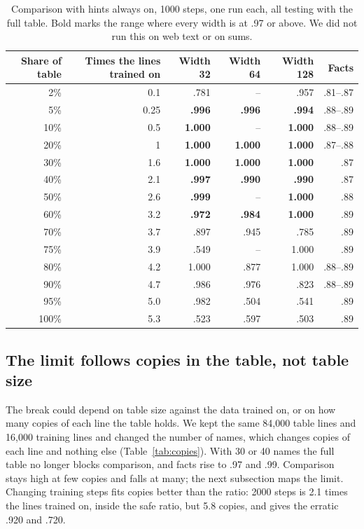 \documentclass[11pt]{article}
\begin{document}
\begin{table}[h]\centering\small
\begin{tabular}{rrrrrr}\toprule
Share of table & Times the lines trained on & Width 32 & Width 64 & Width 128 & Facts\\\midrule
2\% & 0.1 & .781 & -- & .957 & .81--.87\\
5\% & 0.25 & \textbf{.996} & \textbf{.996} & \textbf{.994} & .88--.89\\
10\% & 0.5 & \textbf{1.000} & -- & \textbf{1.000} & .88--.89\\
20\% & 1 & \textbf{1.000} & \textbf{1.000} & \textbf{1.000} & .87--.88\\
30\% & 1.6 & \textbf{1.000} & \textbf{1.000} & \textbf{1.000} & .87\\
40\% & 2.1 & \textbf{.997} & \textbf{.990} & \textbf{.990} & .87\\
50\% & 2.6 & \textbf{.999} & -- & \textbf{1.000} & .88\\
60\% & 3.2 & \textbf{.972} & \textbf{.984} & \textbf{1.000} & .89\\
70\% & 3.7 & .897 & .945 & .785 & .89\\
75\% & 3.9 & .549 & -- & 1.000 & .89\\
80\% & 4.2 & 1.000 & .877 & 1.000 & .88--.89\\
90\% & 4.7 & .986 & .976 & .823 & .88--.89\\
95\% & 5.0 & .982 & .504 & .541 & .89\\
100\% & 5.3 & .523 & .597 & .503 & .89\\\bottomrule
\end{tabular}
\caption{Comparison with hints always on, 1000 steps, one run each, all testing with the full table. Bold marks the range where every width is at .97 or above. We did not run this on web text or on sums.}\label{tab:small}
\end{table}

\subsection{The limit follows copies in the table, not table size}
The break could depend on table size against the data trained on, or on how many copies of each line the table holds. We kept the same 84,000 table lines and 16,000 training lines and changed the number of names, which changes copies of each line and nothing else (Table~\ref{tab:copies}). With 30 or 40 names the full table no longer blocks comparison, and facts rise to .97 and .99. Comparison stays high at few copies and falls at many; the next subsection maps the limit. Changing training steps fits copies better than the ratio: 2000 steps is 2.1 times the lines trained on, inside the safe ratio, but 5.8 copies, and gives the erratic .920 and .720.
\end{document}
